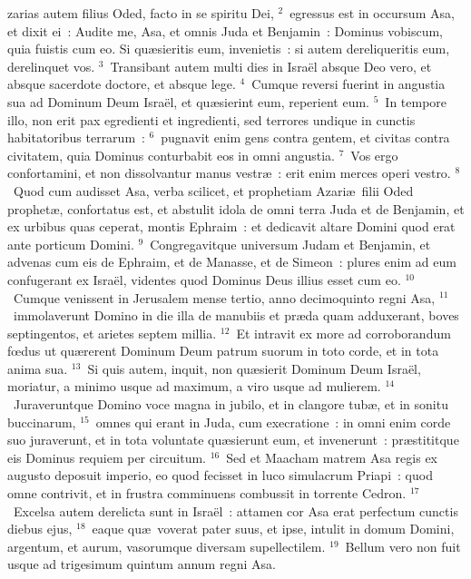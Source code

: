 \bchapter
{}zarias autem filius Oded, facto in se spiritu Dei,
${}^{2}$~egressus est in occursum Asa, et dixit ei~: Audite me, Asa, et omnis Juda et Benjamin~: Dominus vobiscum, quia fuistis cum eo. Si qu\ae sieritis eum, invenietis~: si autem dereliqueritis eum, derelinquet vos.
${}^{3}$~Transibant autem multi dies in Isra\"el absque Deo vero, et absque sacerdote doctore, et absque lege.
${}^{4}$~Cumque reversi fuerint in angustia sua ad Dominum Deum Isra\"el, et qu\ae sierint eum, reperient eum.
${}^{5}$~In tempore illo, non erit pax egredienti et ingredienti, sed terrores undique in cunctis habitatoribus terrarum~:
${}^{6}$~pugnavit enim gens contra gentem, et civitas contra civitatem, quia Dominus conturbabit eos in omni angustia.
${}^{7}$~Vos ergo confortamini, et non dissolvantur manus vestr\ae~: erit enim merces operi vestro.
${}^{8}$~Quod cum audisset Asa, verba scilicet, et prophetiam Azari\ae\ filii Oded prophet\ae , confortatus est, et abstulit idola de omni terra Juda et de Benjamin, et ex urbibus quas ceperat, montis Ephraim~: et dedicavit altare Domini quod erat ante porticum Domini.
${}^{9}$~Congregavitque universum Judam et Benjamin, et advenas cum eis de Ephraim, et de Manasse, et de Simeon~: plures enim ad eum confugerant ex Isra\"el, videntes quod Dominus Deus illius esset cum eo.
${}^{10}$~Cumque venissent in Jerusalem mense tertio, anno decimoquinto regni Asa,
${}^{11}$~immolaverunt Domino in die illa de manubiis et pr\ae da quam adduxerant, boves septingentos, et arietes septem millia.
${}^{12}$~Et intravit ex more ad corroborandum fœdus ut qu\ae rerent Dominum Deum patrum suorum in toto corde, et in tota anima sua.
${}^{13}$~Si quis autem, inquit, non qu\ae sierit Dominum Deum Isra\"el, moriatur, a minimo usque ad maximum, a viro usque ad mulierem.
${}^{14}$~Juraveruntque Domino voce magna in jubilo, et in clangore tub\ae , et in sonitu buccinarum,
${}^{15}$~omnes qui erant in Juda, cum execratione~: in omni enim corde suo juraverunt, et in tota voluntate qu\ae sierunt eum, et invenerunt~: pr\ae stititque eis Dominus requiem per circuitum.
${}^{16}$~Sed et Maacham matrem Asa regis ex augusto deposuit imperio, eo quod fecisset in luco simulacrum Priapi~: quod omne contrivit, et in frustra comminuens combussit in torrente Cedron.
${}^{17}$~Excelsa autem derelicta sunt in Isra\"el~: attamen cor Asa erat perfectum cunctis diebus ejus,
${}^{18}$~eaque qu\ae\ voverat pater suus, et ipse, intulit in domum Domini, argentum, et aurum, vasorumque diversam supellectilem.
${}^{19}$~Bellum vero non fuit usque ad trigesimum quintum annum regni Asa.

